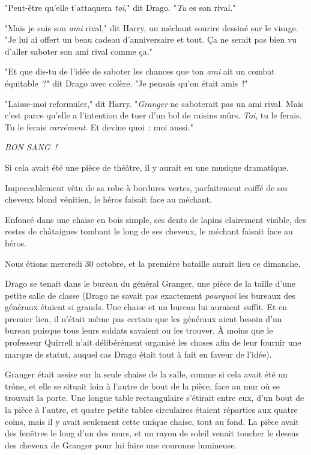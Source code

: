 "Peut-être qu'elle t'attaquera \emph{toi}," dit Drago. "\emph{Tu} es son rival."

"Mais je suis son \emph{ami} rival," dit Harry, un méchant sourire dessiné sur le visage. "Je lui ai offert un beau cadeau d'anniversaire et tout. Ça ne serait pas bien vu d'aller saboter son ami rival comme ça."

"Et que dis-tu de l'idée de saboter les chances que ton \emph{ami} ait un combat équitable~?" dit Drago avec colère. "Je pensais qu'on était amis~!"

"Laisse-moi reformuler," dit Harry. "\emph{Granger} ne saboterait pas un ami rival. Mais c'est parce qu'elle a l'intention de tuer d'un bol de raisins mûrs. \emph{Toi}, tu le ferais. Tu le ferais \emph{carrément}. Et devine quoi~: moi aussi."

\emph{BON SANG~!}

\later

Si cela avait été une pièce de théâtre, il y aurait eu une musique dramatique.

Impeccablement vêtu de sa robe à bordures vertes, parfaitement coiffé de ses cheveux blond vénitien, le héros faisait face au méchant.

Enfoncé dans une chaise en bois simple, ses dents de lapins clairement visible, des restes de châtaignes tombant le long de ses cheveux, le méchant faisait face au héros.

Nous étions mercredi 30 octobre, et la première bataille aurait lieu ce dimanche.

Drago se tenait dans le bureau du général Granger, une pièce de la taille d'une petite salle de classe (Drago ne savait pas exactement \emph{pourquoi} les bureaux des généraux étaient si grands. Une chaise et un bureau lui auraient suffit. Et en premier lieu, il n'était même pas certain que les généraux aient besoin d'un bureau puisque tous leurs soldats savaient ou les trouver. À moins que le professeur Quirrell n'ait délibérément organisé les choses afin de leur fournir une marque de statut, auquel cas Drago était tout à fait en faveur de l'idée).

Granger était assise sur la seule chaise de la salle, comme si cela avait été un trône, et elle se situait loin à l'autre de bout de la pièce, face au mur où se trouvait la porte. Une longue table rectangulaire s'étirait entre eux, d'un bout de la pièce à l'autre, et quatre petite tables circulaires étaient réparties aux quatre coins, mais il y avait seulement cette unique chaise, tout au fond. La pièce avait des fenêtres le long d'un des murs, et un rayon de soleil venait toucher le dessus des cheveux de Granger pour lui faire une couronne lumineuse.

